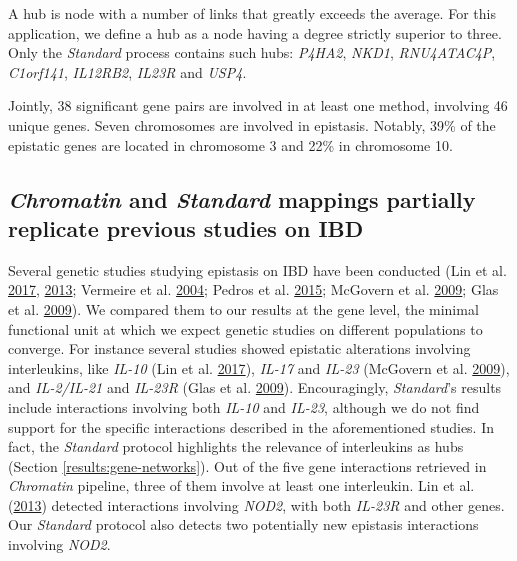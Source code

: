 \documentclass[
  11pt,
]{env/yjiao}
\begin{document}
A hub is node with a number of links that greatly exceeds the average.
For this application, we define a hub as a node having a degree strictly
superior to three. Only the \emph{Standard} process contains such hubs: \emph{P4HA2},
\emph{NKD1}, \emph{RNU4ATAC4P}, \emph{C1orf141}, \emph{IL12RB2}, \emph{IL23R} and \emph{USP4}.

Jointly, 38 significant gene pairs are involved in at least one method,
involving 46 unique genes. Seven chromosomes are involved in epistasis.
Notably, 39\% of the epistatic genes are located in chromosome 3 and 22\%
in chromosome 10.

\hypertarget{results-ibd-soa}{%
\subsection{\texorpdfstring{\emph{Chromatin} and \emph{Standard} mappings partially replicate previous studies on IBD}{Chromatin and Standard mappings partially replicate previous studies on IBD}}\label{results-ibd-soa}}

Several genetic studies studying epistasis on IBD have been conducted
(Lin et al. \protect\hyperlink{ref-lin2017genetic}{2017}, \protect\hyperlink{ref-lin2013nod2}{2013}; Vermeire et al. \protect\hyperlink{ref-vermeire2004genome}{2004}; Pedros et al. \protect\hyperlink{ref-pedros2015epistatic}{2015}; McGovern et al. \protect\hyperlink{ref-mcgovern2009genetic}{2009}; Glas et al. \protect\hyperlink{ref-glas2009novel}{2009}).
We compared them to our results at the gene level, the minimal
functional unit at which we expect genetic studies on different
populations to converge. For instance several studies showed epistatic
alterations involving interleukins, like \emph{IL-10} (Lin et al. \protect\hyperlink{ref-lin2017genetic}{2017}),
\emph{IL-17} and \emph{IL-23} (McGovern et al. \protect\hyperlink{ref-mcgovern2009genetic}{2009}), and \emph{IL-2/IL-21} and
\emph{IL-23R} (Glas et al. \protect\hyperlink{ref-glas2009novel}{2009}). Encouragingly, \emph{Standard}'s results include
interactions involving both \emph{IL-10} and \emph{IL-23}, although we do not find
support for the specific interactions described in the aforementioned
studies. In fact, the \emph{Standard} protocol highlights the relevance of
interleukins as hubs (Section \ref{results:gene-networks}). Out of the five
gene interactions retrieved in \emph{Chromatin} pipeline, three of them involve at
least one interleukin. Lin et al. (\protect\hyperlink{ref-lin2013nod2}{2013}) detected interactions involving \emph{NOD2},
with both \emph{IL-23R} and other genes. Our \emph{Standard} protocol also detects two
potentially new epistasis interactions involving \emph{NOD2}.
\end{document}
